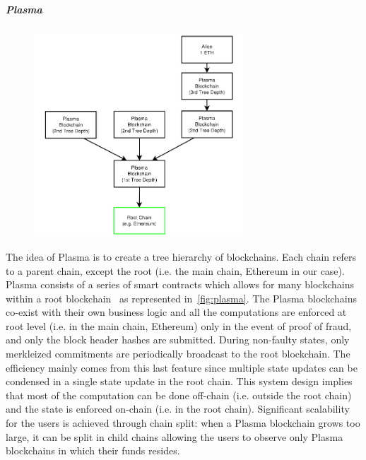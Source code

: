 \subparagraph{Plasma}
\begin{figure}[t]
    \begin{center}
        \includegraphics[width=0.7\textwidth]{./res/img/plasma}
        \label{fig:plasma}
    \end{center}
\end{figure}
The idea of Plasma is to create a tree hierarchy of blockchains. Each chain
refers to a parent chain, except the root (i.e. the main chain, Ethereum in our
case). Plasma consists of a series of smart contracts which allows for many
blockchains within a root blockchain~\cite{poon2017plasma} as represented
in~\autoref{fig:plasma}. The Plasma blockchains co-exist with their own business
logic and all the computations are enforced at root level (i.e. in the main
chain, Ethereum) only in the event of proof of fraud, and only the block header
hashes are submitted. During non-faulty states, only merkleized commitments are
periodically broadcast to the root blockchain. The efficiency mainly comes from
this last feature since multiple state updates can be condensed in a single
state update in the root chain. This system design implies that most of the
computation can be done off-chain (i.e. outside the root chain) and the state is
enforced on-chain (i.e. in the root chain). Significant scalability for the
users is achieved through chain split: when a Plasma blockchain grows too large,
it can be split in child chains allowing the users to observe only Plasma
blockchains in which their funds resides.



